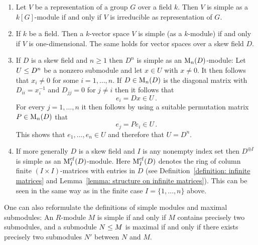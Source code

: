 \begin{example}
  \label{example: simple modules}
  \leavevmode
  \begin{enumerate}
    \item
      \label{enumerate: irreducible is simple}
      Let $V$ be a representation of a group $G$ over a field $k$.
      Then $V$ is simple as a $k[G]$-module if and only if $V$ is irreducible as representation of $G$.
    \item
      If $k$ be a field.
      Then a $k$-vector space $V$ is simple (as a $k$-module) if and only if $V$ is one-dimensional.
      The same holds for vector spaces over a skew field $D$.
    \item
      If $D$ is a skew field and $n \geq 1$ then $D^n$ is simple as an $\operatorname{M}_n(D)$-module:
      Let $U \leq D^n$ be a nonzero submodule and let $x \in U$ with $x \neq 0$.
      It then follows that $x_i \neq 0$ for some $i = 1, \dotsc, n$.
      If $D \in \operatorname{M}_n(D)$ is the diagonal matrix with $D_{ii} = x_i^{-1}$ and $D_{jj} = 0$ for $j \neq i$ then it follows that
      \[
            e_i
        =   D x
        \in U \,.
      \]
      For every $j = 1, \dotsc, n$ it then follows by using a suitable permutation matrix $P \in \operatorname{M}_n(D)$ that
      \[
            e_j
        =   P e_i
        \in U \,.
      \]
      This shows that $e_1, \dotsc, e_n \in U$ and therefore that $U = D^n$.
    \item
      \label{enumerate: D^I simple as a Matcf module}
      If more generally $D$ is a skew field and $I$ is any nonempty index set then $D^{\oplus I}$ is simple as an $\operatorname{M}_I^{{\operatorname{cf}}}(D)$-module.
      Here $\operatorname{M}_I^{{\operatorname{cf}}}(D)$ denotes the ring of column finite $(I \times I)$-matrices with entries in $D$ (see Definition~\ref{definition: infinite matrices} and Lemma~\ref{lemma: structure on infinite matrices}).
      This can be seen in the same way as in the finite case $I = \{1, \dotsc, n\}$ above.
  \end{enumerate}
\end{example}


\begin{remark}
  \label{remark: alternative formulation of simple and maximal}
  One can also reformulate the definitions of simple modules and maximal submodules:
  An $R$-module $M$ is simple if and only if $M$ contains precisely two submodules, and a submodule $N \leq M$ is maximal if and only if there exists precisely two submodules $N'$ between $N$ and $M$.
\end{remark}



